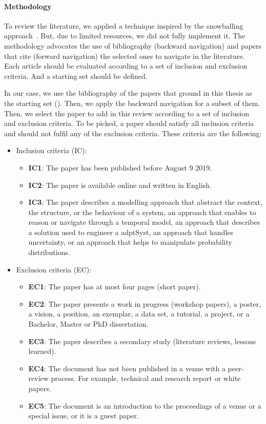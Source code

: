 \paragraph{Methodology}
To review the literature, we applied a technique inspired by the snowballing approach~\cite{DBLP:conf/ease/Wohlin14}.
But, due to limited resources, we did not fully implement it.
The methodology advocates the use of bibliography (backward navigation) and papers that cite (forward navigation) the selected ones to navigate in the literature.
Each article should be evaluated according to a set of inclusion and exclusion criteria.
And a starting set should be defined.

In our case, we use the bibliography of the papers that ground in this thesis as the starting set (\cf {}).
Then, we apply the backward navigation for a subset of them.
Then, we select the paper to add in this review according to a set of inclusion and exclusion criteria.
To be picked, a paper should satisfy all inclusion criteria and should not fulfil any of the exclusion criteria.
These criteria are the following:
\begin{itemize}
	\item Inclusion criteria (IC):
	\begin{itemize}
		\item \textbf{IC1}: The paper has been published before August 9 2019.
		\item \textbf{IC2}: The paper is available online and written in English.
		\item \textbf{IC3}: The paper describes a modelling approach that abstract the \gls{context}, the \gls{structure}, or the \gls{behaviour} of a system, an approach that enables to reason or navigate through a temporal model, an approach that describes a solution used to engineer a \gls{adptSyst}, an approach that handles uncertainty, or an approach that helps to manipulate probability distributions. 
	\end{itemize}
	\item Exclusion criteria (EC):
	\begin{itemize}
		\item \textbf{EC1}: The paper has at most four pages (short paper).
		\item \textbf{EC2}: The paper presents a work in progress (workshop papers), a poster, a vision, a position, an exemplar, a data set, a tutorial, a project, or a Bachelor, Master or PhD dissertation.
		\item \textbf{EC3}: The paper describes a secondary study (\eg literature reviews, lessons learned).
		\item \textbf{EC4}: The document has not been published in a venue with a peer-review process. For example, technical and research report or white papers.
		\item \textbf{EC5}: The document is an introduction to the proceedings of a venue or a special issue, or it is a guest paper.
	\end{itemize}
\end{itemize}

